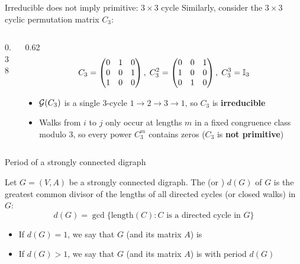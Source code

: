 \documentclass[aspectratio=169]{beamer}\usepackage[]{graphicx}\usepackage[]{xcolor}
\begin{document}
\begin{frame}{Irreducible does not imply primitive: $3 \times 3$ cycle}
Similarly, consider the $3 \times 3$ cyclic permutation matrix $C_3$:
\vfill
\begin{columns}[c]
\begin{column}{0.38\textwidth}
\centering
{}
\end{column}
\begin{column}{0.62\textwidth}
\[
C_3 = \begin{pmatrix} 0 & 1 & 0 \\ 0 & 0 & 1 \\ 1 & 0 & 0 \end{pmatrix},
\;
C_3^2 = \begin{pmatrix} 0 & 0 & 1 \\ 1 & 0 & 0 \\ 0 & 1 & 0 \end{pmatrix},
\;
C_3^3 = \mathbb{I}_3
\]
\vspace{0.2cm}
\begin{itemize}
\item $\mathcal{G}(C_3)$ is a single $3$-cycle $1 \to 2 \to 3 \to 1$, so $C_3$ is \textbf{irreducible}
\item Walks from $i$ to $j$ only occur at lengths $m$ in a fixed congruence class modulo $3$, so every power $C_3^m$ contains zeros ($C_3$ is \textbf{not primitive})
\end{itemize}
\end{column}
\end{columns}
\end{frame}

\begin{frame}{Period of a strongly connected digraph}
\begin{definition}
Let $G = (V, A)$ be a strongly connected digraph. The  (or ) $d(G)$ of $G$ is the greatest common divisor of the lengths of all directed cycles (or closed walks) in $G$:
\[
d(G) = \gcd\{\text{length}(C) : C \text{ is a directed cycle in } G\}
\]
\begin{itemize}
\item If $d(G) = 1$, we say that $G$ (and its matrix $A$) is 
\item If $d(G) > 1$, we say that $G$ (and its matrix $A$) is  with period $d(G)$
\end{itemize}
\end{definition}
\end{frame}
\end{document}
